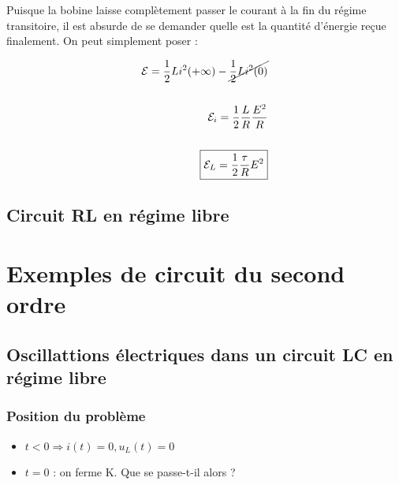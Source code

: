 \documentclass{article}
\begin{document}
Puisque la bobine laisse complètement passer le courant à la fin du régime transitoire, il est absurde de se demander quelle est la quantité d'énergie reçue finalement. On peut simplement poser :

\begin{align*}\begin{split}
\mathcal{E}=\frac{1}{2}Li^2(+\infty) - \cancel{\frac{1}{2}Li^2(0)}\\\\
\mathcal{E}_i=\frac{1}{2}\frac{L}{R}\frac{E^2}{R}\\\\
\boxed{\mathcal{E}_L=\frac{1}{2}\frac{\tau}{R}E^2}
\end{split}\end{align*}


\subsection{Circuit RL en régime libre}


\section{Exemples de circuit du second ordre}

\subsection{Oscillattions électriques dans un circuit LC en régime libre}

\subsubsection{Position du problème}


\begin{itemize}
    \item $t<0 \Longrightarrow i(t)=0, u_L(t)=0$
    \item $t=0$ : on ferme K. Que se passe-t-il alors ?
\end{itemize}
\end{document}
